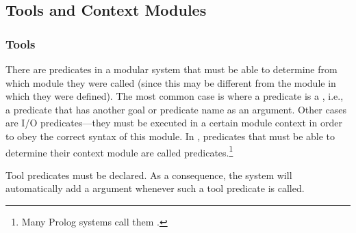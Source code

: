 \subsection{Tools and Context Modules}

\subsubsection{Tools\label{tools}}

There are predicates in a modular system that must be able to determine from
which
module they were called (since this may be different from the module
in which they were defined).
The most common case is where a predicate is a ,
i.e., a predicate that has another goal or predicate name as an argument.
Other cases are I/O predicates---they must be executed in a
certain module context in order to obey the correct syntax of this module.
In {\eclipse},  predicates that must be able to determine their context module
are called  predicates.\footnote{
    Many Prolog systems call them .}

Tool predicates must be declared.  As a consequence, the system will
automatically add a  argument whenever such a tool
predicate is called.

